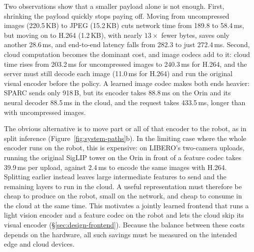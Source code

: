 Two observations show that a smaller payload alone is not enough.
First, shrinking the payload quickly stops paying off. Moving from uncompressed images (220.5\,KB) to JPEG (15.2\,KB)
cuts network time from 189.8 to 58.4\,ms, but moving on to H.264
(1.2\,KB), with nearly $13\times$ fewer bytes, saves only another
28.6\,ms, and end-to-end latency falls from 282.3 to just 272.4\,ms.
Second, cloud computation becomes the dominant cost, and image codecs add
to it: cloud time rises from 203.2\,ms for uncompressed images to
240.3\,ms for H.264, and the server must still decode each image
(11.0\,ms for H.264) and run the original visual encoder before the
policy. A learned image codec makes both ends heavier: SPARC sends only
918\,B, but its encoder takes 88.8\,ms on the Orin and its neural decoder
88.5\,ms in the cloud, and the request takes 433.5\,ms, longer than with
uncompressed images.

The obvious alternative is to move part or all of that encoder to the
robot, as in split inference (Figure~\ref{fig:system-paths}b). In the
limiting case where the whole encoder runs on the robot, this is
expensive: on LIBERO's two-camera uploads, running the original SigLIP
tower on the Orin in front of a feature codec takes 39.9\,ms per upload,
against 2.4\,ms to encode the same images with H.264. Splitting earlier instead leaves
large intermediate features to send and the remaining layers to run in
the cloud. A useful representation must therefore be
cheap to produce on the robot, small on the network, and cheap to consume
in the cloud at the same time. This motivates a jointly learned frontend
that runs a light vision encoder and a feature codec on the robot and lets
the cloud skip its visual encoder (\S\ref{sec:design-frontend}). Because the balance between
these costs depends on the hardware, all such savings must be measured on
the intended edge and cloud devices.


